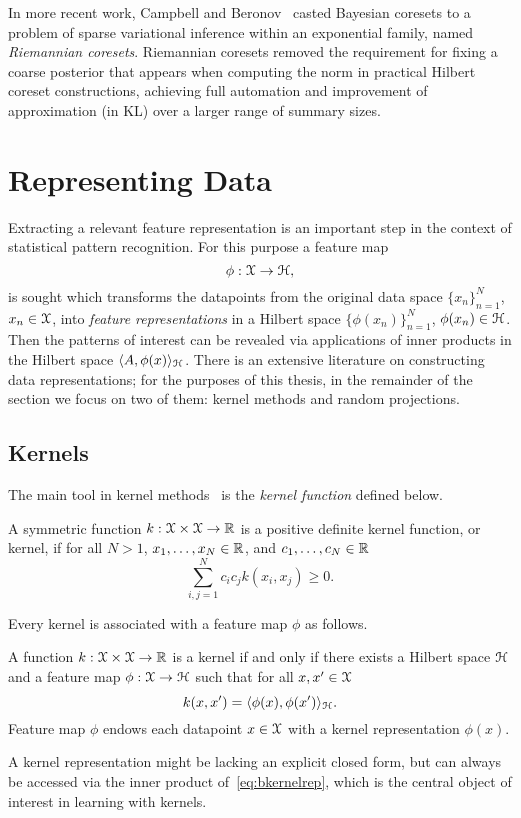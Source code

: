 In more recent work, Campbell and Beronov~\citep{campbell19neurips} casted Bayesian coresets to a problem of sparse variational inference within an exponential family, named \emph{Riemannian coresets}. Riemannian coresets removed the requirement for fixing a coarse posterior that appears when computing the norm in practical Hilbert coreset constructions, achieving full automation and improvement of approximation (in KL) over a larger range of summary sizes.


\section{Representing Data}
\label{sec:b-representing-data}
Extracting a relevant feature representation is an important step in the context of statistical pattern recognition. For this purpose a feature map 
\[
\phi: \mathcal{X} \rightarrow \mathcal{H},
\]
is sought which transforms the datapoints from the original data space $\{x_n\}_{n=1}^{N}$, $x_n \in \mathcal{X}$, into \emph{feature representations} in a Hilbert space $\{\phi(x_n)\}_{n=1}^{N}$, $\phi(x_n) \in \mathcal{H}$. Then the patterns of interest can be revealed via applications of inner products in the Hilbert space $\langle A, \phi(x) \rangle_{\mathcal{H}}$. There is an extensive literature on constructing data representations; for the purposes of this thesis, in the remainder of the section we focus on two of them: kernel methods and random projections.


\subsection{Kernels}
\label{subsec:b-kernels}

The main tool in kernel methods~\cite{scholkopf02} is the \emph{kernel function} defined below.
\begin{ndefn} \label{def:bkernelfun}
	A symmetric function $k: \mathcal{X} \times \mathcal{X} \rightarrow \mathbb{R} $ is a positive definite kernel function, or kernel, if for all $N>1$, $x_1, \ldots, x_N \in \mathbb{R}$, and $c_1, \ldots, c_N \in \mathbb{R}$ 
	\[
	\sum_{i,j=1}^{N} c_ic_j k(x_i, x_j) \geq 0.
	\]
\end{ndefn}
Every kernel is associated with a feature map $\phi$ as follows.
\begin{ndefn} \label{def:bkernelrepr}
	 A function $k: \mathcal{X} \times \mathcal{X} \rightarrow \mathbb{R}$ is a kernel if and only if there exists a Hilbert space $\mathcal{H}$ and a feature map $\phi: \mathcal{X} \rightarrow \mathcal{H}$ such that for all $x, x' \in \mathcal{X}$
	 \[
	 \label{eq:bkernelrep}
	 k(x,x') = \langle \phi(x), \phi(x') \rangle_{\mathcal{H}}.
	 \]
	 Feature map $\phi$ endows each datapoint $x \in \mathcal{X}$ with a kernel representation $\phi(x)$.
\end{ndefn}
A kernel representation might be lacking an explicit closed form, but can always be accessed via the inner product of~\cref{eq:bkernelrep}, which is the central object of interest in learning with kernels.

